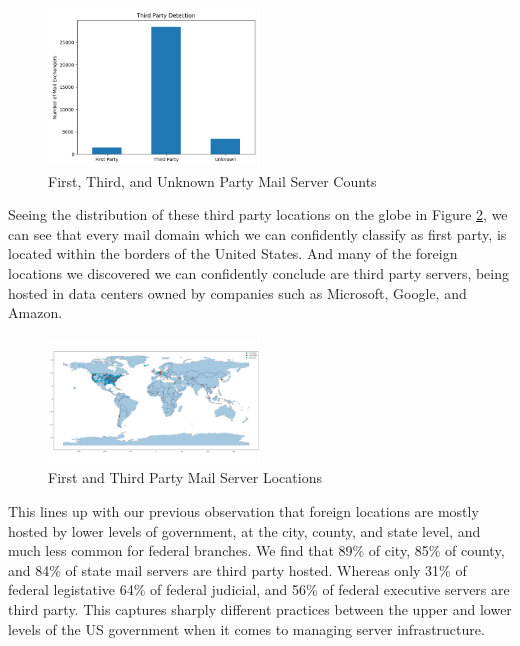 \documentclass{hotnets21}
\begin{document}
\begin{figure}
\label{fig:thirdpartysummary}
\noindent\includegraphics[width=0.5\textwidth]{Summary/Third Party Exchanges.png}
\caption{First, Third, and Unknown Party Mail Server Counts}
\end{figure}

Seeing the distribution of these third party locations on the globe in Figure \ref{fig:thirdpartyglobe}, we can see that every mail domain which we can confidently classify as first party, is located within the borders of the United States.
And many of the foreign locations we discovered we can confidently conclude are third party servers, being hosted in data centers owned by companies such as Microsoft, Google, and Amazon.

\begin{figure}
\label{fig:thirdpartyglobe}
\noindent\includegraphics[width=0.5\textwidth]{Summary/Globe Third Party.png}
\caption{First and Third Party Mail Server Locations}
\end{figure}

This lines up with our previous observation that foreign locations are mostly hosted by lower levels of government, at the city, county, and state level, and much less common for federal branches.
We find that 89\% of city, 85\% of county, and 84\% of state mail servers are third party hosted.
Whereas only 31\% of federal legistative 64\% of federal judicial, and 56\% of federal executive servers are third party.
This captures sharply different practices between the upper and lower levels of the US government when it comes to managing server infrastructure.
\end{document}
